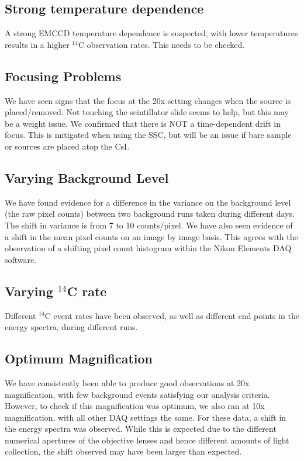 \documentclass[11pt]{article}
\newcommand{\nuc}[2]{\ensuremath{^{#1}}#2}
\begin{document}
\subsection{Strong temperature dependence}
A strong EMCCD temperature dependence is suspected, with lower temperatures results in a higher \nuc{14}{C} observation rates. This needs to be checked. 

\subsection{Focusing Problems}
We have seen signs that the focus at the 20x setting changes when the source is placed/removed. Not touching the scintillator slide seems to help, but this may be a weight issue.
We confirmed that there is NOT a time-dependent drift in focus. This is mitigated when using the SSC, but will be an issue if bare sample or sources are placed atop the CsI. 

\subsection{Varying Background Level}
We have found evidence for a difference in the variance on the background level (the raw pixel counts) between two background runs taken during different days. 
The shift in variance is from 7 to 10 counts/pixel. We have also seen evidence of a shift in the mean pixel counts on an image by image basis. This agrees with
the observation of a shifting pixel count histogram within the Nikon Elements DAQ software.

\subsection{Varying \nuc{14}{C} rate}
Different \nuc{14}{C} event rates have been observed, as well as different end points in the energy spectra, during different runs. 


\subsection{Optimum Magnification}
We have consistently been able to produce good observations at 20x magnification, with few background events satisfying our analysis criteria. However, to check if this magnification was optimum, we also ran at 10x magnification, with all other DAQ settings the same. For these data, a shift in the energy spectra was observed. While this is expected due to the different numerical apertures of the objective lenses and hence different amounts of light collection, the shift observed may have been larger than expected. 
\end{document}
